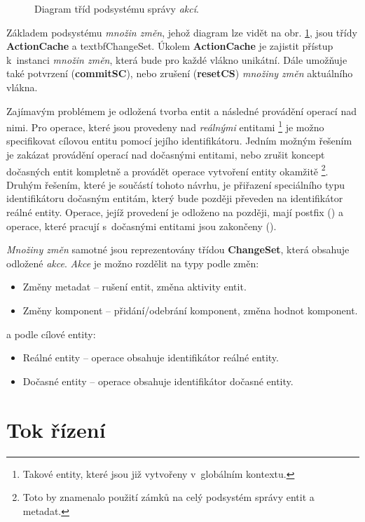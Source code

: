 \begin{figure}[H]
	\caption{Diagram tříd podsystému správy \emph{akcí}.}
	\label{Fig:DESActionDiag}
\end{figure}

Základem podsystému \emph{množin změn}, jehož diagram lze vidět na obr. \ref{Fig:DESActionDiag}, jsou třídy \textbf{ActionCache} a textbf{ChangeSet}. Úkolem \textbf{ActionCache} je zajistit přístup k~instanci \emph{množin změn}, která bude pro každé vlákno unikátní. Dále umožňuje také potvrzení (\textbf{commitSC}), nebo zrušení (\textbf{resetCS}) \emph{množiny změn} aktuálního vlákna. 

Zajímavým problémem je odložená tvorba entit a následné provádění operací nad nimi. Pro operace, které jsou provedeny nad \emph{reálnými} entitami \footnote{Takové entity, které jsou již vytvořeny v~globálním kontextu.} je možno specifikovat cílovou entitu pomocí jejího identifikátoru. Jedním možným řešením je zakázat provádění operací nad dočasnými entitami, nebo zrušit koncept dočasných entit kompletně a provádět operace vytvoření entity okamžitě \footnote{Toto by znamenalo použití zámků na celý podsystém správy entit a metadat.}. Druhým řešením, které je součástí tohoto návrhu, je přiřazení speciálního typu identifikátoru dočasným entitám, který bude později převeden na identifikátor reálné entity. Operace, jejíž provedení je odloženo na později, mají postfix  () a operace, které pracují s~dočasnými entitami jsou zakončeny  ().

\emph{Množiny změn} samotné jsou reprezentovány třídou \textbf{ChangeSet}, která obsahuje odložené \emph{akce}. \emph{Akce} je možno rozdělit na typy podle změn:
\begin{itemize}
	\item Změny metadat -- rušení entit, změna aktivity entit.
	\item Změny komponent -- přidání/odebrání komponent, změna hodnot komponent.
\end{itemize}
\noindent a podle cílové entity: 
\begin{itemize}
	\item Reálné entity -- operace obsahuje identifikátor reálné entity.
	\item Dočasné entity -- operace obsahuje identifikátor dočasné entity.
\end{itemize}

\section{Tok řízení}

